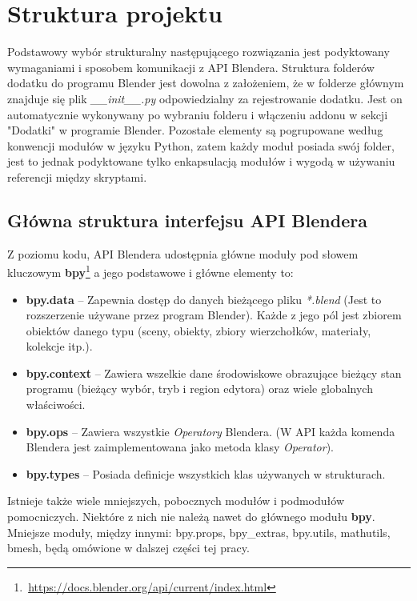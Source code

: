 \documentclass[brudnopis]{xmgr}
\begin{document}
\section {Struktura projektu}
Podstawowy wybór strukturalny następującego rozwiązania jest podyktowany wymaganiami i sposobem komunikacji z API Blendera. Struktura folderów dodatku do programu Blender jest dowolna z założeniem, że w folderze głównym znajduje się plik \emph{\_\_init\_\_.py} odpowiedzialny za rejestrowanie dodatku. Jest on automatycznie wykonywany po wybraniu folderu i włączeniu addonu w sekcji "Dodatki" w programie Blender. Pozostałe elementy są pogrupowane według konwencji modułów w języku Python, zatem każdy moduł posiada swój folder, jest to jednak podyktowane tylko enkapsulacją modułów i wygodą w używaniu referencji między skryptami.

\subsection{Główna struktura interfejsu API Blendera}
Z poziomu kodu, API Blendera udostępnia główne moduły pod słowem kluczowym \textbf{bpy}\footnote{\,\url{https://docs.blender.org/api/current/index.html}} a jego podstawowe i główne elementy to:
\begin{itemize}
\item \textbf{bpy.data} -- Zapewnia dostęp do danych bieżącego pliku \emph{*.blend} (Jest to rozszerzenie używane przez program Blender). Każde z jego pól jest zbiorem obiektów danego typu (sceny, obiekty, zbiory wierzchołków, materiały, kolekcje itp.).
\item \textbf{bpy.context} -- Zawiera wszelkie dane środowiskowe obrazujące bieżący stan programu (bieżący wybór, tryb i region edytora) oraz wiele globalnych właściwości.
\item \textbf{bpy.ops} -- Zawiera wszystkie \emph{Operatory} Blendera. (W API każda komenda Blendera jest zaimplementowana jako metoda klasy \emph{Operator}).
\item \textbf{bpy.types} -- Posiada definicje wszystkich klas używanych w strukturach.
\end{itemize}
Istnieje także wiele mniejszych, pobocznych modułów i podmodułów pomocniczych. Niektóre z nich nie należą nawet do głównego modułu \textbf{bpy}. Mniejsze moduły, między innymi: bpy.props, bpy\_extras, bpy.utils, mathutils, bmesh, będą omówione w dalszej części tej pracy.
\end{document}
